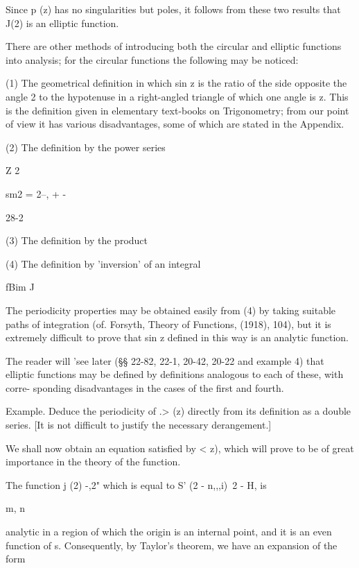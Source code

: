 {Since p (z) has no singularities but poles, it follows from these two
results that J(2) is an elliptic function.

There are other methods of introducing both the circular and elliptic
functions into analysis; for the circular functions the following may
be noticed:

(1) The geometrical definition in which sin z is the ratio of the side
opposite the angle 2 to the hypotenuse in a right-angled triangle of
which one angle is z. This is the definition given in elementary
text-books on Trigonometry; from our point of view it has various
disadvantages, some of which are stated in the Appendix.

(2) The definition by the power series

Z 2

sm2 = 2--, + -

28-2

%
%

(3) The definition by the product

(4) The definition by 'inversion' of an integral

fBim J

The periodicity properties may be obtained easily from (4) by taking
suitable paths of integration (of. Forsyth, Theory of Functions,
(1918), 104), but it is extremely difficult to prove that sin z
defined in this way is an analytic function.

The reader will 'see later (§§ 22-82, 22-1, 20-42, 20-22 and 
example 4) that elliptic functions may be defined by definitions
analogous to each of these, with corre- sponding disadvantages in the
cases of the first and fourth.

Example. Deduce the periodicity of .> (z) directly from its definition
as a double series. [It is not difficult to justify the necessary
derangement.]


We shall now obtain an equation satisfied by < z), which will prove to
be of great importance in the theory of the function.

The function j (2) -,2" which is equal to S' (2 - n,,,i)~2 - H, is

m, n

analytic in a region of which the origin is an internal point, and it
is an even function of s. Consequently, by Taylor's theorem, we have
an expansion of the form

}
